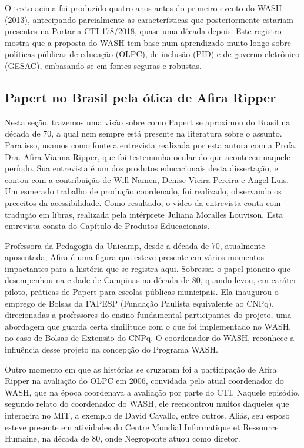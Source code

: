 O texto acima foi produzido quatro anos antes do primeiro evento do WASH (2013), antecipando parcialmente as características que posteriormente estariam presentes na Portaria CTI 178/2018, quase uma década depois. Este registro mostra que a proposta do WASH tem base num aprendizado muito longo sobre políticas públicas de educação (OLPC), de inclusão (PID) e de governo eletrônico (GESAC), embasando-se em fontes seguras e robustas.

\subsection[Papert no Brasil pela ótica de Afira Ripper]{Papert no Brasil pela ótica de Afira Ripper}\label{Papert no Brasil pela ótica de Afira Ripper}
Nesta seção, trazemos uma visão sobre como Papert se aproximou do Brasil na década de 70, a qual nem sempre está presente na literatura sobre o assunto. Para isso, usamos como fonte a entrevista realizada por esta autora com a Profa. Dra. Afira Vianna Ripper, que foi testemunha ocular do que aconteceu naquele período. Sua entrevista é um dos produtos educacionais desta dissertação, e contou com a contribuição de Will Namen, Denise Vieira Pereira e Angel Luis. Um esmerado trabalho de produção coordenado, foi realizado, observando os preceitos da acessibilidade. Como resultado, o vídeo da entrevista conta com tradução em libras, realizada pela intérprete Juliana Moralles Louvison. Esta entrevista consta do Capítulo de Produtos Educacionais.

Professora da Pedagogia da Unicamp, desde a década de 70, atualmente aposentada, Afira é uma figura que esteve presente em vários momentos impactantes para a história que se registra aqui. Sobressai o papel pioneiro que  desempenhou na cidade de Campinas na década de 80, quando levou, em caráter piloto, práticas de Papert para escolas públicas municipais. Ela inaugurou o emprego de Bolsas da FAPESP (Fundação Paulista equivalente ao CNPq), direcionadas a professores do ensino fundamental participantes do projeto, uma abordagem que guarda certa similitude com o que foi implementado no WASH, no caso de Bolsas de Extensão do CNPq. O coordenador do WASH, reconhece a influência desse projeto na concepção do Programa WASH.

Outro momento em que as histórias se cruzaram foi a participação de Afira Ripper na avaliação do OLPC em 2006, convidada pelo atual coordenador do WASH, que na época coordenava a avaliação por parte do CTI. Naquele episódio, segundo relato do coordenador do WASH, ele reencontrou muitos daqueles que interagira no MIT, a exemplo de David Cavallo, entre outros. Aliás, seu esposo esteve presente em atividades do Centre Mondial Informatique et Ressource Humaine, na década de 80, onde Negroponte atuou como diretor.


